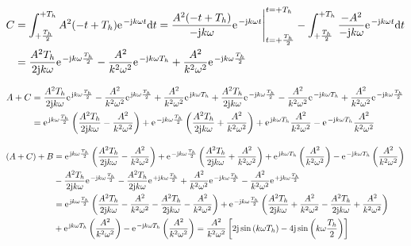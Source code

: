 \documentclass[11pt,a4paper,DIV=12]{scrartcl}
\newcommand{\diff}{\mathrm{d}}
\begin{document}
%
\begin{align}
	C&=\int_{+\frac{T_h}{2}}^{+T_h}A^2(-t+T_h)\e^{-\im k \omega t}\diff t
	=\frac{A^2(-t+T_h)}{-\im k \omega }\e^{-\im k \omega t}\Bigg |_{t=+\frac{T_h}{2}}^{t=+T_h}-\int_{+\frac{T_h}{2}}^{+T_h}\frac{-A^2}{-\im k \omega }\e^{-\im k \omega t}\diff t\nonumber \\
	&=\frac{A^2T_h}{2\im k \omega}\e^{-\im k \omega \frac{T_h}{2}}-\frac{A^2}{k^2\omega^2}\e^{-\im k \omega T_h}+\frac{A^2}{k^2\omega^2}\e^{-\im k \omega \frac{T_h}{2}}
\end{align}
%

%
\begin{align}
	A+C&=\frac{A^2T_h}{2\im k \omega }\e^{\im k \omega \frac{T_h}{2}}-\frac{A^2}{k^2\omega^2}\e^{\im k \omega \frac{T_h}{2}}+\frac{A^2}{k^2\omega^2}\e^{\im k \omega T_h}+\frac{A^2T_h}{2\im k \omega}\e^{-\im k \omega \frac{T_h}{2}}-\frac{A^2}{k^2\omega^2}\e^{-\im k \omega T_h}+\frac{A^2}{k^2\omega^2}\e^{-\im k \omega \frac{T_h}{2}}\nonumber \\
	&=\e^{\im k \omega \frac{T_h}{2}}\left (\frac{A^2T_h}{2\im k \omega}-\frac{A^2}{k^2\omega^2}\right )+\e^{-\im k \omega \frac{T_h}{2}}\left (\frac{A^2T_h}{2\im k \omega}+\frac{A^2}{k^2\omega^2}\right )+\e^{\im k \omega T_h}\frac{A^2}{k^2\omega^2}-\e^{-\im k \omega T_h}\frac{A^2}{k^2\omega^2}
\end{align}
%

%
\begin{align}
	(A+C)+B&=\e^{\im k \omega \frac{T_h}{2}}\left (\frac{A^2T_h}{2\im k \omega}-\frac{A^2}{k^2\omega^2}\right )+\e^{-\im k \omega \frac{T_h}{2}}\left (\frac{A^2T_h}{2\im k \omega}+\frac{A^2}{k^2\omega^2}\right )+\e^{\im k \omega T_h}\left (\frac{A^2}{k^2\omega^2}\right )-\e^{-\im k \omega T_h}\left (\frac{A^2}{k^2\omega^2}\right ) \nonumber \\
	&-\frac{A^2T_h}{2\im k \omega}\e^{-\im k \omega \frac{T_h}{2}}-\frac{A^2T_h}{2\im k \omega}\e^{+\im k \omega \frac{T_h}{2}}+\frac{A^2}{k^2\omega^2}\e^{-\im k \omega \frac{T_h}{2}}-\frac{A^2}{ k^2 \omega^2}\e^{+\im k \omega \frac{T_h}{2}}\nonumber \\
	&=\e^{\im k \omega \frac{T_h}{2}}\left (\frac{A^2T_h}{2\im k \omega}-\frac{A^2}{k^2\omega^2}-\frac{A^2T_h}{2\im k \omega}-\frac{A^2}{k^2\omega^2}\right )+\e^{-\im k \omega \frac{T_h}{2}}\left (\frac{A^2T_h}{2\im k \omega}+\frac{A^2}{k^2\omega^2}-\frac{A^2T_h}{2 \im k \omega}+\frac{A^2}{k^2\omega^2}\right )\nonumber \\
	&+\e^{\im k \omega T_h}\left (\frac{A^2}{k^2\omega^2}\right )-\e^{-\im k \omega T_h}\left (\frac{A^2}{k^2\omega^2}\right )=\frac{A^2}{k^2\omega^2}\left [2\im\sin\left(k\omega T_h\right)-4\im\sin\left(k\omega \frac{T_h}{2}\right)\right ]
\end{align}
%
\end{document}
